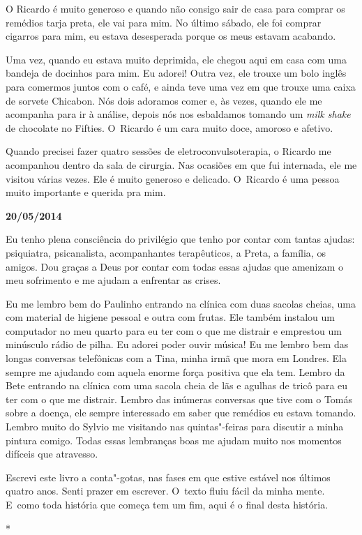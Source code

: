 O Ricardo é muito generoso e quando não consigo sair de casa para
comprar os remédios tarja preta, ele vai para mim. No último sábado, ele
foi comprar cigarros para mim, eu estava desesperada porque os meus
estavam acabando.

Uma vez, quando eu estava muito deprimida, ele chegou aqui em casa com
uma bandeja de docinhos para mim. Eu adorei! Outra vez, ele trouxe um
bolo inglês para comermos juntos com o café, e ainda teve uma vez em que
trouxe uma caixa de sorvete Chicabon. Nós dois adoramos comer e, às
vezes, quando ele me acompanha para ir à análise, depois nós nos
esbaldamos tomando um \emph{milk shake} de chocolate no Fifties. O~Ricardo é um cara muito doce, amoroso e afetivo.

Quando precisei fazer quatro sessões de eletroconvulsoterapia, o Ricardo
me acompanhou dentro da sala de cirurgia. Nas ocasiões em que fui
internada, ele me visitou várias vezes. Ele é muito generoso e delicado.
O~Ricardo é uma pessoa muito importante e querida pra mim.

\begin{center}\asterisc{}\end{center}

\begin{flushright}\textbf{20/05/2014}\end{flushright}


Eu tenho plena consciência do privilégio que tenho por contar com tantas
ajudas: psiquiatra, psicanalista, acompanhantes terapêuticos, a Preta, a
família, os amigos. Dou graças a Deus por contar com todas essas ajudas
que amenizam o meu sofrimento e me ajudam a enfrentar as crises.

Eu me lembro bem do Paulinho entrando na clínica com duas sacolas
cheias, uma com material de higiene pessoal e outra com frutas. Ele
também instalou um computador no meu quarto para eu ter com o que me
distrair e emprestou um minúsculo rádio de pilha. Eu adorei poder ouvir
música! Eu me lembro bem das longas conversas telefônicas com a Tina,
minha irmã que mora em Londres. Ela sempre me ajudando com aquela enorme
força positiva que ela tem. Lembro da Bete entrando na clínica com uma
sacola cheia de lãs e agulhas de tricô para eu ter com o que me
distrair. Lembro das inúmeras conversas que tive com o Tomás sobre a
doença, ele sempre interessado em saber que remédios eu estava tomando.
Lembro muito do Sylvio me visitando nas quintas"-feiras para discutir a
minha pintura comigo. Todas essas lembranças boas me ajudam muito nos
momentos difíceis que atravesso.

Escrevi este livro a conta"-gotas, nas fases em que estive estável nos
últimos quatro anos. Senti prazer em escrever. O~texto fluiu fácil da
minha mente. E~como toda história que começa tem um fim, aqui é o final
desta história.

\begin{center}*\end{center}



